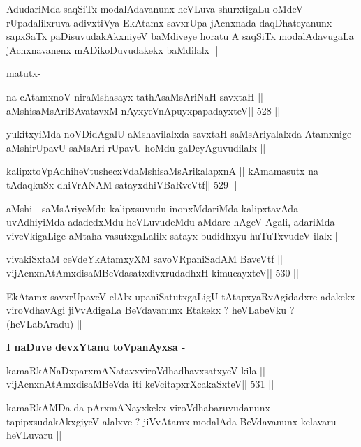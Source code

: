 \begin{artha}
AdudariMda saqSiTx modalAdavanunx heVLuva shurxtigaLu oMdeV
rUpadalilxruva adivxtiVya EkAtamx savxrUpa jAcnxnada daqDhateyanunx
sapxSaTx paDisuvudakAkxniyeV baMdiveye horatu A saqSiTx modalAdavugaLa
jAcnxnavanenx mADikoDuvudakekx baMdilalx ||

matutx- 
\end{artha}

\begin{shl}
na cA\s\s tamxnoV niraMshasayx tathA\s saMsAriNaH savxtaH ||
aMshisaMsAriBAvatavxM nAyxyeVnApuyxpapadayxteV\hfill || 528 ||
\end{shl}

\begin{artha}
yukitxyiMda noVDidAgalU aMshavilalxda savxtaH saMsAriyalalxda
Atamxnige aMshirUpavU saMsAri rUpavU hoMdu gaDeyAguvudilalx ||
\end{artha}

\begin{shl}
kalipxtoVpAdhiheVtushecxVdaMshisaMsArikalapxnA ||
kAmamasutx na tAdaqkuSx dhiVrANAM satayxdhiVBaRveVtf\hfill || 529 ||
\end{shl}

\begin{artha}
aMshi - saMsAriyeMdu kalipxsuvudu inonxMdariMda kalipxtavAda
uvAdhiyiMda adadedxMdu heVLuvudeMdu aMdare hAgeV Agali, adariMda
viveVkigaLige aMtaha vasutxgaLalilx satayx budidhxyu huTuTxvudeV ilalx ||
\end{artha}

\begin{shl}
vivakiSxtaM ceVdeYkAtamxyXM savoVRpaniSadAM BaveVtf ||
vijAcnxnAtAmxdisaMBeVdasatxdivxrudadhxH kimucayxteV\hfill || 530 ||
\end{shl}

\begin{artha}
EkAtamx savxrUpaveV elAlx upaniSatutxgaLigU tAtapxyaRvAgidadxre
adakekx viroVdhavAgi jiVvAdigaLa BeVdavanunx Etakekx ? heVLabeVku ?
(heVLabAradu) ||
\end{artha}

\medskip
\centerline{\textbf{I naDuve devxYtanu toVpanAyxsa -}}
\begin{shl}
kamaRkANaDxparxmANatavxviroVdhadhavxsatxyeV kila ||
vijAcnxnAtAmxdisaMBeVda iti keVcitapxrXcakaSxteV\hfill || 531 ||
\end{shl}

\begin{artha}
kamaRkAMDa da pArxmANayxkekx viroVdhabaruvudanunx tapipxsudakAkxgiyeV
alalxve ? jiVvAtamx modalAda BeVdavanunx kelavaru heVLuvaru ||
\end{artha}


